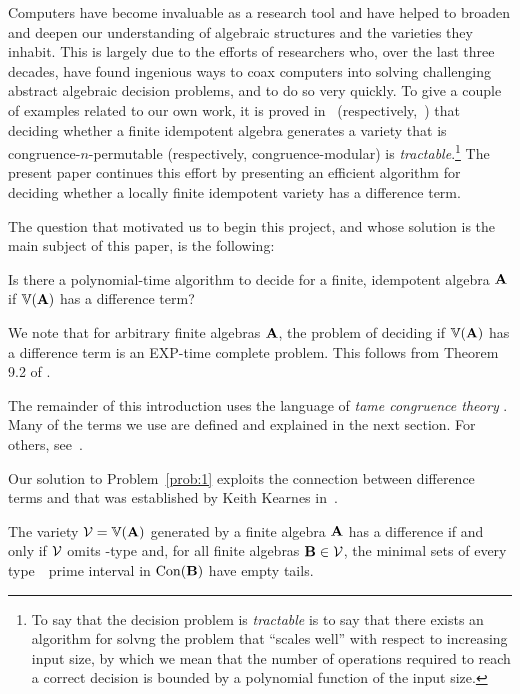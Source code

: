 Computers have become invaluable as a research tool and have helped to
broaden and deepen our understanding of algebraic structures and the
varieties they inhabit.  This is largely due to the efforts
of researchers who, over the last three decades, have found ingenious
ways to coax computers into solving challenging abstract algebraic
decision problems, and to do so very quickly.
To give a couple of examples related to our own work,
it is proved in~\cite{MR3239624} (respectively,~\cite{Freese:2009})
that deciding whether a finite idempotent algebra generates a variety that is congruence-$n$-permutable
(respectively, congruence-modular) is \emph{tractable}.\footnote{To
  say that the decision problem is \emph{tractable} is to say
  that there exists an algorithm for solvng the problem that ``scales
  well'' with respect to increasing input size, by which we mean that
  the number of operations required to reach a correct decision is
  bounded by a polynomial function of the input size.}
The present paper continues this effort by presenting an efficient
algorithm for deciding whether a locally finite idempotent variety has a
difference term.

The question that motivated us to begin this project, and
whose solution is the main subject of this paper, is the following:
\begin{prob}
  \label{prob:1}
  Is there a polynomial-time algorithm to decide for a finite,
  idempotent algebra $\mathbf{A}$ if $\operatorname{\mathbb{V}}(\mathbf{A})$ has a difference term?
\end{prob}

We note that for arbitrary finite algebras $\mathbf{A}$, the problem of deciding if $\operatorname{\mathbb{V}}(\mathbf{A})$ has a difference term is an EXP-time complete problem.  This follows from Theorem 9.2 of \cite{Freese:2009}.

The remainder of this introduction uses the language of \emph{tame congruence theory} \tct.  Many of the terms we use are defined and explained
in the next section.  For others, see~\cite{HM:1988}.

Our solution to Problem~\ref{prob:1} exploits the connection
between difference terms and \tct that was established
by Keith Kearnes in~\cite{MR1358491}.

\begin{theorem}
\label{thm:KearnesThm}
The variety $\mathcal{V} = \operatorname{\mathbb{V}}(\mathbf{A})$ generated by a
finite algebra $\mathbf{A}$ has a difference  if and only if
$\mathcal{V}$ omits \tct-type \utyp and, for all finite algebras
$\mathbf{B} \in \mathcal{V}$,
the minimal sets of every type~\atyp\ prime interval in
$\operatorname{Con}(\mathbf{B})$ have empty tails.
\end{theorem}

